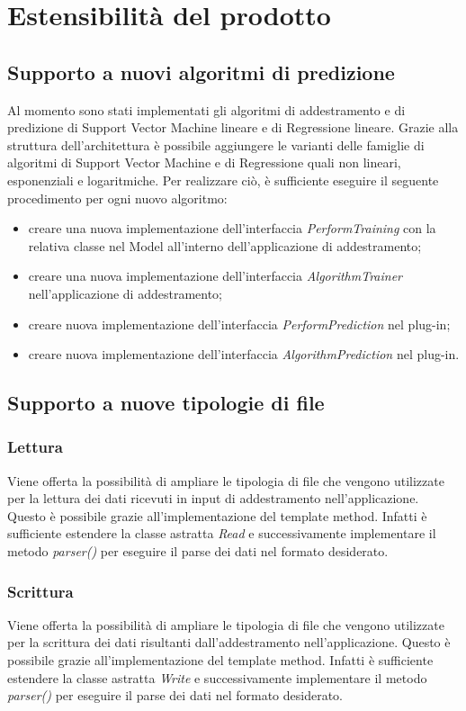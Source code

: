 \section{Estensibilità del prodotto}
	\subsection{Supporto a nuovi algoritmi di predizione}
	Al momento sono stati implementati gli algoritmi di addestramento e di predizione di Support Vector Machine lineare e di Regressione lineare. Grazie alla struttura dell'architettura è possibile aggiungere le varianti delle famiglie di algoritmi di Support Vector Machine e di Regressione quali non lineari, esponenziali e logaritmiche.
	Per realizzare ciò, è sufficiente eseguire il seguente procedimento per ogni nuovo algoritmo:
	\begin{itemize}
		\item creare una nuova implementazione dell'interfaccia \textit{PerformTraining} con la relativa classe nel Model all'interno dell'applicazione di addestramento;
		\item creare una nuova implementazione dell'interfaccia \textit{AlgorithmTrainer} nell'applicazione di addestramento;
		\item creare nuova implementazione dell'interfaccia \textit{PerformPrediction} nel plug-in;
		\item creare nuova implementazione dell'interfaccia \textit{AlgorithmPrediction} nel plug-in.
	\end{itemize}
	\subsection{Supporto a nuove tipologie di file}
		\subsubsection{Lettura}
		Viene offerta la possibilità di ampliare le tipologia di file che vengono utilizzate per la lettura dei dati ricevuti in input di addestramento nell'applicazione. Questo è possibile grazie all'implementazione del template method. Infatti è sufficiente estendere la classe astratta \textit{Read} e successivamente implementare il metodo \textit{parser()} per eseguire il parse dei dati nel formato desiderato.
		\subsubsection{Scrittura}
		Viene offerta la possibilità di ampliare le tipologia di file che vengono utilizzate per la scrittura dei dati risultanti dall'addestramento nell'applicazione. Questo è possibile grazie all'implementazione del template method. Infatti è sufficiente estendere la classe astratta \textit{Write} e successivamente implementare il metodo \textit{parser()} per eseguire il parse dei dati nel formato desiderato.